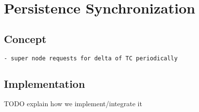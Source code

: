 \chapter{Persistence Synchronization}\label{ch:psync}

\section{Concept}
\begin{lstlisting}[style=customsh]
  - super node requests for delta of TC periodically
\end{lstlisting}

\section{Implementation}
TODO explain how we implement/integrate it

